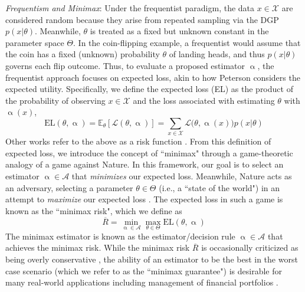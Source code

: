 \documentclass[letterpaper,12pt]{article}
\newcommand{\given}{|}
\begin{document}
\textit{Frequentism and Minimax}: Under the frequentist paradigm, the data $x \in \mathcal{X}$ are considered random because they arise from repeated sampling via the DGP $p(x \given \theta)$. Meanwhile, $\theta$ is treated as a fixed but unknown constant in the parameter space $\Theta$. In the coin-flipping example, a frequentist would assume that the coin has a fixed (unknown) probability $\theta$ of landing heads, and thus $p(x\given \theta)$ governs each flip outcome. Thus, to evaluate a proposed estimator $\upalpha$, the frequentist approach focuses on expected loss, akin to how Peterson \cite{peterson2017} considers the expected utility. Specifically, we define the expected loss (EL) as the product of the probability of observing $x \in \mathcal{X}$ and the loss associated with estimating $\theta$ with $\upalpha(x)$,
\begin{equation}
	\text{EL}(\theta, \upalpha) = \mathbb{E}_{\theta}[\mathcal{L}(\theta, \upalpha)] = \sum_{x \in \mathcal{X}} \mathcal{L}\big( \theta, \upalpha(x) \big) p(x \given \theta)  \label{eq:EL}
\end{equation}
Other works refer to the above as a risk function \cite{nikulin2001}. From this definition of expected loss, we introduce the concept of ``minimax" through a game-theoretic analogy of a game against Nature. In this framework, our goal is to select an estimator $\upalpha \in \mathcal{A}$ that \textit{minimizes} our expected loss. Meanwhile, Nature acts as an adversary, selecting a parameter $\theta \in \Theta$ (i.e., a ``state of the world") in an attempt to \textit{maximize} our expected loss \cite{ulansky2021}. The expected loss in such a game is known as the ``minimax risk", which we define as
\begin{equation}
	\overline{{R}} = \min_{\upalpha \in \mathcal{A}} \max_{\theta \in \Theta} \text{EL}(\theta, \upalpha) \label{eq:minimaxrisk}
\end{equation}
The minimax estimator is known as the estimator/decision rule $\upalpha \in \mathcal{A}$ that achieves the minimax risk. While the minimax risk $\overline{R}$ is occasionally criticized as being overly conservative \cite{peterson2017}, the ability of an estimator to be the best in the worst case scenario (which we refer to as the ``minimax guarantee") is desirable for many real-world applications including management of financial portfolios \cite{DENG2005278}.
\end{document}

